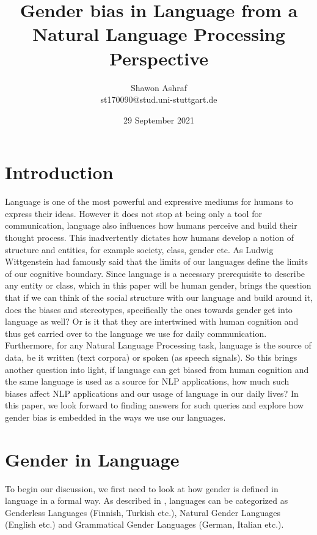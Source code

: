 \documentclass{article}
\title{Gender bias in Language from a Natural Language Processing Perspective}
\author{Shawon Ashraf \\ st170090@stud.uni-stuttgart.de}
\date{29 September 2021}
\begin{document}
\maketitle

\section*{Introduction}
Language is one of the most powerful and expressive mediums for humans to express their ideas. However it does not stop at being only a tool for communication, language also influences how humans perceive and build their thought process. This inadvertently dictates how humans develop a notion of structure and entities, for example society, class, gender etc. As Ludwig Wittgenstein had famously said that the limits of our languages define the limits of our cognitive boundary. Since language is a necessary prerequisite to describe any entity or class, which in this paper will be human gender, brings the question that if we can think of the social structure with our language and build around it, does the biases and stereotypes, specifically the ones towards gender get into language as well? Or is it that they are intertwined with human cognition and thus get carried over to the language we use for daily communication. Furthermore, for any Natural Language Processing task, language is the source of data, be it written (text corpora) or spoken (as speech signals). So this brings another question into light, if language can get biased from human cognition and the same language is used as a source for NLP applications, how much such biases affect NLP applications and our usage of language in our daily lives? In this paper, we look forward to finding answers for such queries and explore how gender bias is embedded in the ways we use our languages.

\section*{Gender in Language}
To begin our discussion, we first need to look at how gender is defined in language in a formal way. As described in \cite{menegatti2017gender}, languages can be categorized \cite{braun2005cognitive} as Genderless Languages (Finnish, Turkish etc.), Natural Gender Languages (English etc.) and Grammatical Gender Languages (German, Italian etc.).
\end{document}
